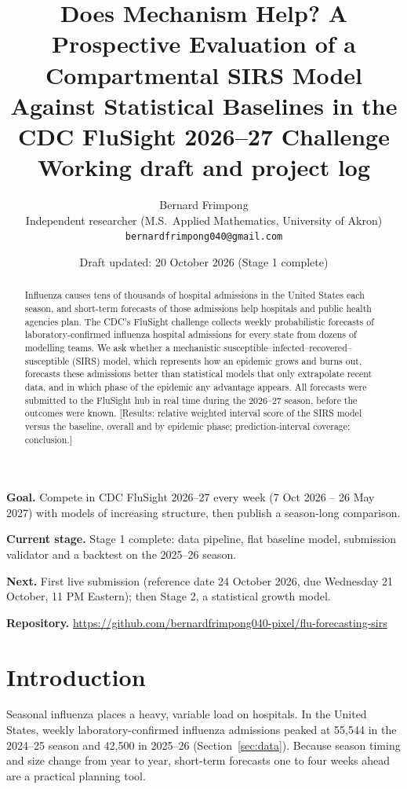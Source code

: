 \documentclass[11pt]{article}
\title{Does Mechanism Help? A Prospective Evaluation of a Compartmental SIRS Model
       Against Statistical Baselines in the CDC FluSight 2026--27 Challenge\\[4pt]
       \large Working draft and project log}
\author{Bernard Frimpong\\
        \small Independent researcher (M.S.\ Applied Mathematics, University of Akron)\\
        \small \texttt{bernardfrimpong040@gmail.com}}
\date{Draft updated: 20 October 2026 \quad (Stage 1 complete)}
\newcommand{\tbd}[1]{\textcolor{red!70!black}{[#1]}}
\begin{document}
\maketitle

\begin{note}
\textbf{Goal.} Compete in CDC FluSight 2026--27 every week (7 Oct 2026 -- 26 May 2027)
with models of increasing structure, then publish a season-long comparison.

\textbf{Current stage.} Stage 1 complete: data pipeline, flat baseline model,
submission validator and a backtest on the 2025--26 season.

\textbf{Next.} First live submission (reference date 24 October 2026, due Wednesday
21 October, 11 PM Eastern); then Stage 2, a statistical growth model.

\textbf{Repository.} \url{https://github.com/bernardfrimpong040-pixel/flu-forecasting-sirs}
\end{note}

\begin{abstract}
Influenza causes tens of thousands of hospital admissions in the United States each
season, and short-term forecasts of those admissions help hospitals and public health
agencies plan. The CDC's FluSight challenge collects weekly probabilistic forecasts of
laboratory-confirmed influenza hospital admissions for every state from dozens of
modelling teams. We ask whether a mechanistic susceptible--infected--recovered--susceptible
(SIRS) model, which represents how an epidemic grows and burns out, forecasts these
admissions better than statistical models that only extrapolate recent data, and in
which phase of the epidemic any advantage appears. All forecasts were submitted to the
FluSight hub in real time during the 2026--27 season, before the outcomes were known.
\tbd{Results: relative weighted interval score of the SIRS model versus the baseline,
overall and by epidemic phase; prediction-interval coverage; conclusion.}
\end{abstract}

\section{Introduction}
\label{sec:intro}

Seasonal influenza places a heavy, variable load on hospitals. In the United States,
weekly laboratory-confirmed influenza admissions peaked at 55{,}544 in the 2024--25
season and 42{,}500 in 2025--26 (Section~\ref{sec:data}). Because season timing and
size change from year to year, short-term forecasts one to four weeks ahead are a
practical planning tool.
\end{document}
